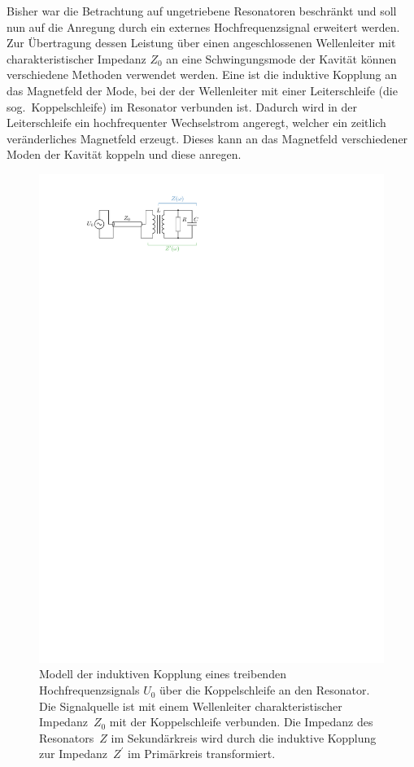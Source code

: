 Bisher war die Betrachtung auf ungetriebene Resonatoren beschränkt und soll nun auf die Anregung durch ein externes Hochfrequenzsignal erweitert werden.
Zur Übertragung dessen Leistung über einen angeschlossenen Wellenleiter mit charakteristischer Impedanz $Z_0$ an eine Schwingungsmode der Kavität können verschiedene Methoden verwendet werden.
Eine ist die induktive Kopplung an das Magnetfeld der Mode, bei der der Wellenleiter mit einer Leiterschleife (die sog.\ Koppelschleife) im Resonator verbunden ist.
Dadurch wird in der Leiterschleife ein hochfrequenter Wechselstrom angeregt, welcher ein zeitlich veränderliches Magnetfeld erzeugt. Dieses kann an das Magnetfeld verschiedener Moden der Kavität koppeln und diese anregen.
\begin{figure}[htb]
  \centering
  \includegraphics[scale=1.4]{./figs/RLC_coupling.pdf}
  \caption{Modell der induktiven Kopplung eines treibenden Hochfrequenzsignals $U_0$ über die Koppelschleife an den Resonator. Die Signalquelle ist mit einem Wellenleiter charakteristischer Impedanz~$Z_0$ mit der Koppelschleife verbunden. Die Impedanz des Resonators~$Z$ im Sekundärkreis wird durch die induktive Kopplung zur Impedanz~$Z^\prime$ im Primärkreis transformiert.}
  \label{fig:rlc_coupling}
\end{figure}

